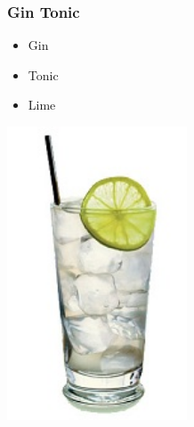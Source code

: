 \documentclass[a4paper,norsk]{article}
\begin{document}
\subsubsection*{Gin Tonic}
\begin{minipage}[c]{0.45\textwidth}
\begin{itemize}
	\item Gin
		\item Tonic
		\item Lime
\end{itemize}
\end{minipage}
\hfill
\begin{minipage}[c]{0.45\textwidth}
  \includegraphics[width=0.4\textwidth]{gt.jpg}
\end{minipage}
\end{document}
